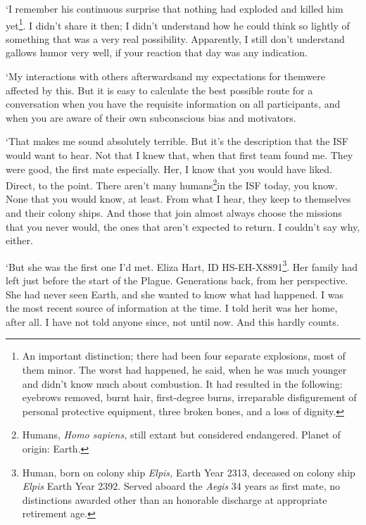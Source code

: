 `I remember his continuous surprise that nothing had exploded and
killed him yet\footnote{An important distinction; there had been four
separate explosions, most of them minor. The worst had happened, he
said, when he was much younger and didn't know much about
combustion. It had resulted in the following: eyebrows removed, burnt
hair, first-degree burns, irreparable disfigurement of personal
protective equipment, three broken bones, and a loss of dignity.}. I
didn't share it then; I didn't understand how he could think so
lightly of something that was a very real possibility. Apparently, I
still don't understand gallows humor very well, if your reaction that
day was any indication.

`My interactions with others afterwards\textemdash and my
expectations for them\textemdash were affected by this. But it is
easy to calculate the best possible route for a conversation when you
have the requisite information on all participants, and when you are
aware of their own subconscious bias and motivators.

`That makes me sound absolutely terrible. But it's the description
that the ISF would want to hear. Not that I knew that, when that first
team found me. They were good, the first mate especially. Her, I know
that you would have liked. Direct, to the point. There aren't many
humans\footnote{Humans, \textit{Homo sapiens,} still extant but
considered endangered. Planet of origin: Earth.}in the ISF today, you
know. None that you would know, at least. From what I hear, they keep
to themselves and their colony ships. And those that join almost
always choose the missions that you never would, the ones that aren't
expected to return. I couldn't say why, either.

`But she was the first one I'd met. Eliza Hart, ID
HS-EH-X8891\footnote{Human, born on colony ship \textit{Elpis,} Earth
Year 2313, deceased on colony ship \textit{Elpis} Earth Year
2392. Served aboard the \textit{Aegis} 34 years as first mate, no
distinctions awarded other than an honorable discharge at appropriate
retirement age.}. Her family had left just before the start of the
Plague. Generations back, from her perspective. She had never seen
Earth, and she wanted to know what had happened. I was the most recent
source of information at the time. I told her\textemdash it was her
home, after all. I have not told anyone since, not until now. And this
hardly counts.

